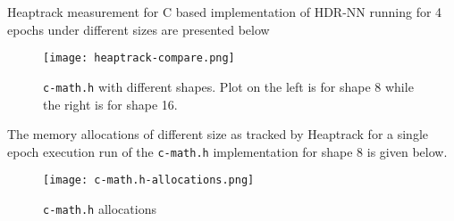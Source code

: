 Heaptrack measurement for C based implementation of HDR-NN running for 4 epochs under different sizes are presented below

\begin{figure}[ht]
	\centering
	\texttt{[image: heaptrack-compare.png]}
	\caption{\texttt{c-math.h} with different shapes. Plot on the left is for shape 8 while the right is for shape 16.}
	\label{fig:memory-shape}
\end{figure}

The memory allocations of different size as tracked by Heaptrack for a single epoch execution run of the \texttt{c-math.h} implementation for shape 8 is given below.

\begin{figure}[ht]
	\centering
	\texttt{[image: c-math.h-allocations.png]}
	\caption{\texttt{c-math.h} allocations}
\end{figure}
